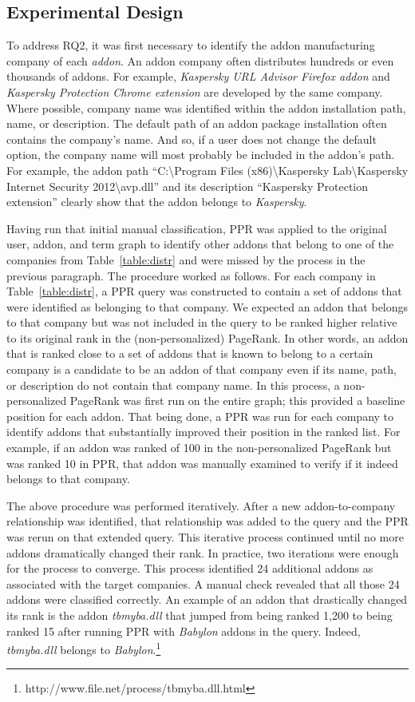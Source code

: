 \documentclass[10pt,letterpaper]{article}
\begin{document}
\subsection*{Experimental Design}

To address RQ2, it was first necessary to identify the addon manufacturing company of each\textit{ addon}. An addon company often distributes hundreds or even thousands of addons. For example, \textit{Kaspersky URL Advisor Firefox addon} and \textit{Kaspersky Protection Chrome extension} are developed by the same company. Where possible, company name was identified within the addon installation path, name, or description. The default path of an addon package installation often contains the company's name. And so, if a user does not change the default option, the company name will most probably be included in the addon's path. For example, the addon path ``C:{\textbackslash}Program Files (x86){\textbackslash}Kaspersky Lab{\textbackslash}Kaspersky Internet Security 2012{\textbackslash}avp.dll'' and its description ``Kaspersky Protection extension'' clearly show that the addon belongs to \textit{Kaspersky}. 

Having run that initial manual classification, PPR was applied to the original user, addon, and term graph to identify other addons that belong to one of the companies from Table~\ref{table:distr} and were missed by the process in the previous paragraph. The procedure worked as follows. For each company in Table~\ref{table:distr}, a PPR query was constructed to contain a set of addons that were identified as belonging to that company. We expected an addon that belongs to that company but was not included in the query to be ranked higher relative to its original rank in the (non-personalized) PageRank. In other words, an addon that is ranked close to a set of addons that is known to belong to a certain company is a candidate to be an addon of that company even if its name, path, or description do not contain that company name. In this process, a non-personalized PageRank was first run on the entire graph; this provided a baseline position for each addon. That being done, a PPR was run for each company to identify addons that substantially improved their position in the ranked list. For example, if an addon was ranked of 100 in the non-personalized PageRank but was ranked 10 in PPR, that addon was manually examined to verify if it indeed belongs to that company. 

The above procedure was performed iteratively. After a new addon-to-company relationship was identified, that relationship was added to the query and the PPR was rerun on that extended query. This iterative process continued until no more addons dramatically changed their rank. In practice, two iterations were enough for the process to converge. This process identified 24 additional addons as associated with the target companies. A manual check revealed that all those 24 addons were classified correctly. An example of an addon that drastically changed its rank is the addon \textit{tbmyba.dll }that jumped from being ranked 1,200 to being ranked 15 after running PPR with \textit{Babylon} addons in the query. Indeed, \textit{tbmyba.dll }belongs to \textit{Babylon}.\footnote{ http://www.file.net/process/tbmyba.dll.html}
\end{document}
